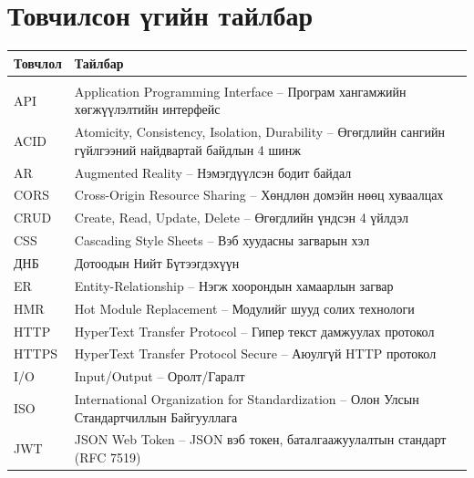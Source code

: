 \documentclass[12pt,a4paper]{report}
\newcommand{\MglNames}{%
  \renewcommand{\figurename}{Зураг}%
  \renewcommand{\tablename}{Хүснэгт}%
  \renewcommand{\contentsname}{ГАРЧИГ}%
  \renewcommand{\listfigurename}{ЗУРГИЙН ЖАГСААЛТ}%
  \renewcommand{\listtablename}{ХҮСНЭГТИЙН ЖАГСААЛТ}%
  \renewcommand{\chaptername}{БҮЛЭГ}%
  \renewcommand{\appendixname}{ХАВСРАЛТ}%
  \renewcommand{\bibname}{НОМ ЗҮЙ}%
  \renewcommand{\refname}{НОМ ЗҮЙ}%
  \renewcommand{\indexname}{Индекс}%
  \renewcommand{\abstractname}{Хураангуй}%
}
\begin{document}


\MglNames
\renewcommand{\contentsname}{ГАРЧИГ}
\tableofcontents
\renewcommand{\listfigurename}{ЗУРГИЙН ЖАГСААЛТ}
\listoffigures
\renewcommand{\listtablename}{ХҮСНЭГТИЙН ЖАГСААЛТ}
\listoftables
\clearpage

\chapter*{Товчилсон үгийн тайлбар}

\begin{longtable}{@{} p{3.5cm} p{11cm} @{}}
\textbf{Товчлол} & \textbf{Тайлбар} \\[6pt]
\hline\\[-6pt]
API & Application Programming Interface -- Програм хангамжийн хөгжүүлэлтийн интерфейс \\[4pt]
ACID & Atomicity, Consistency, Isolation, Durability -- Өгөгдлийн сангийн гүйлгээний найдвартай байдлын 4 шинж \\[4pt]
AR & Augmented Reality -- Нэмэгдүүлсэн бодит байдал \\[4pt]
CORS & Cross-Origin Resource Sharing -- Хөндлөн домэйн нөөц хуваалцах \\[4pt]
CRUD & Create, Read, Update, Delete -- Өгөгдлийн үндсэн 4 үйлдэл \\[4pt]
CSS & Cascading Style Sheets -- Вэб хуудасны загварын хэл \\[4pt]
ДНБ & Дотоодын Нийт Бүтээгдэхүүн \\[4pt]
ER & Entity-Relationship -- Нэгж хоорондын хамаарлын загвар \\[4pt]
HMR & Hot Module Replacement -- Модулийг шууд солих технологи \\[4pt]
HTTP & HyperText Transfer Protocol -- Гипер текст дамжуулах протокол \\[4pt]
HTTPS & HyperText Transfer Protocol Secure -- Аюулгүй HTTP протокол \\[4pt]
I/O & Input/Output -- Оролт/Гаралт \\[4pt]
ISO & International Organization for Standardization -- Олон Улсын Стандартчиллын Байгууллага \\[4pt]
JWT & JSON Web Token -- JSON вэб токен, баталгаажуулалтын стандарт (RFC 7519) \\[4pt]

\end{longtable}
\end{document}
